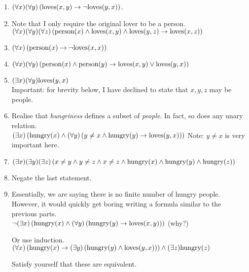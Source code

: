 \documentclass[10pt,a4paper]{article}
\begin{document}
\begin{enumerate}
    \item \( (\forall x) (\forall y) \left( \textrm{loves}(x, y) \rightarrow \neg \textrm{loves}(y, x) \right) \).
    \item Note that I only require the original lover to be a person. \\
    \( (\forall x) (\forall y) (\forall z) \left( 
        \textrm{person}(x) \land \textrm{loves}(x, y) \land \textrm{loves}(y, z) \rightarrow \textrm{loves}(x, z) \right) \)
    \item \( (\forall x) \left( \textrm{person}(x) \rightarrow \neg \textrm{loves}(x, x) \right) \)
    \item \( (\forall x) (\forall y) \left(
        \textrm{person}(x) \land \textrm{person}(y) \rightarrow \textrm{loves}(x, y) \lor \textrm{loves}(y, x) \right) \)
    \item \( (\exists x) (\forall y) \textrm{loves}(y, x) \) \\

    Important: for brevity below, I have declined to state that \(x, y, z\) may be people.
    \item Realise that \emph{hungriness} defines a subset of \emph{people}.
    In fact, so does any unary relation.\\
    \( (\exists x) \left( \textrm{hungry}(x) \land (\forall y) \left( 
        y \ne x \land \textrm{hungry}(y) \rightarrow \textrm{loves}(y, x) \right) \right) \)
    Note: \(y \ne x\) is very important here.

    \item \( (\exists x) (\exists y) (\exists z) \left( x \ne y \land y \ne z \land 
        x \ne z \land \textrm{hungry}(x) \land \textrm{hungry}(y) \land \textrm{hungry}(z) \right) \)

    \item Negate the last statement.

    \item Essentially, we are saying there is no finite number of hungry people.
    However, it would quickly get boring writing a formula similar to the previous parts. \\
    \( \neg (\exists x) \left( \textrm{hungry}(x) \land 
        (\forall y) \left( \textrm{hungry}(y) \rightarrow \textrm{loves}(x, y) \right) \right) \) (why?)

    Or use induction.
    \( (\forall x) \left( \textrm{hungry}(x) \rightarrow (\exists y) \left(
        \textrm{hungry}(y) \land \textrm{loves}(y, x) \right) \right) \land 
        (\exists z) \textrm{hungry}(z) \)

    Satisfy yourself that these are equivalent.
\end{enumerate}
\end{document}
